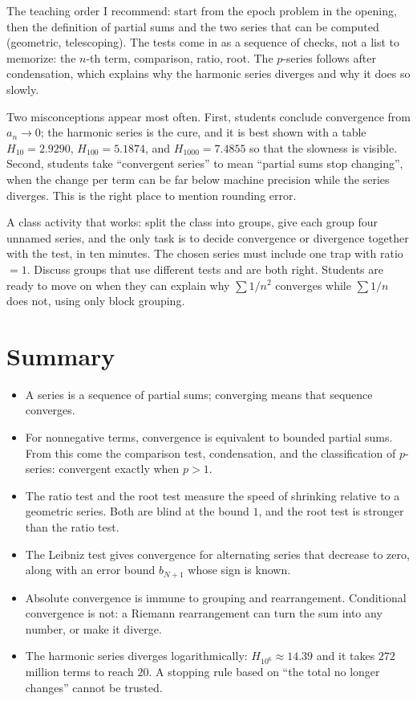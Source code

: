 \begin{untukdosen}
The teaching order I recommend: start from the epoch problem in the opening, then the
definition of partial sums and the two series that can be computed (geometric,
telescoping). The tests come in as a sequence of checks, not a list to memorize: the
$n$-th term, comparison, ratio, root. The $p$-series follows after condensation, which
explains why the harmonic series diverges and why it does so slowly.

Two misconceptions appear most often. First, students conclude convergence from
$a_n \to 0$; the harmonic series is the cure, and it is best shown with a table
$H_{10} = 2.9290$, $H_{100} = 5.1874$, and $H_{1000} = 7.4855$ so that the slowness is
visible. Second, students take ``convergent series'' to mean ``partial sums stop changing'',
when the change per term can be far below machine precision while the series diverges. This
is the right place to mention rounding error.

A class activity that works: split the class into groups, give each group four unnamed
series, and the only task is to decide convergence or divergence together with the test,
in ten minutes. The chosen series must include one trap with ratio $=1$. Discuss groups that
use different tests and are both right. Students are ready to move on when they can explain
why $\sum 1/n^2$ converges while $\sum 1/n$ does not, using only block grouping.
\end{untukdosen}

\section{Summary}

\begin{ringkasan}
\begin{itemize}
\item A series is a sequence of partial sums; converging means that sequence converges.
\item For nonnegative terms, convergence is equivalent to bounded partial sums. From this
      come the comparison test, condensation, and the classification of $p$-series:
      convergent exactly when $p>1$.
\item The ratio test and the root test measure the speed of shrinking relative to a
      geometric series. Both are blind at the bound $1$, and the root test is stronger than
      the ratio test.
\item The Leibniz test gives convergence for alternating series that decrease to zero,
      along with an error bound $b_{N+1}$ whose sign is known.
\item Absolute convergence is immune to grouping and rearrangement. Conditional
      convergence is not: a Riemann rearrangement can turn the sum into any number, or make
      it diverge.
\item The harmonic series diverges logarithmically: $H_{10^6} \approx 14.39$ and it takes
      $272$ million terms to reach $20$. A stopping rule based on ``the total no longer
      changes'' cannot be trusted.
\end{itemize}
\end{ringkasan}

